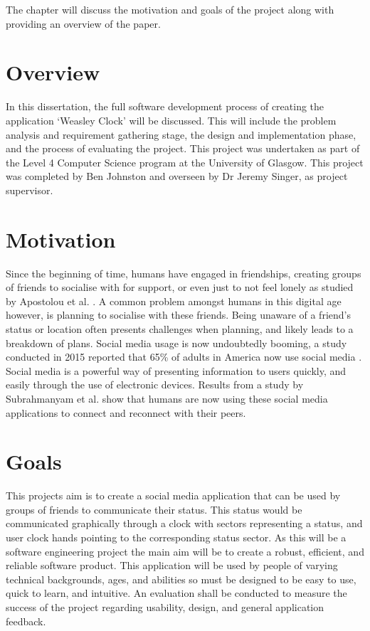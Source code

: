 The chapter will discuss the motivation and goals of the project along with providing an overview of the paper.

\section{Overview}

In this dissertation, the full software development process of creating the application `Weasley Clock' will be discussed. This will include the problem analysis and requirement gathering stage, the design and implementation phase, and the process of evaluating the project. This project was undertaken as part of the Level 4 Computer Science program at the University of Glasgow. This project was completed by Ben Johnston and overseen by Dr Jeremy Singer, as project supervisor.

\section{Motivation}
Since the beginning of time, humans have engaged in friendships, creating groups of friends to socialise with for support, or even just to not feel lonely as studied by Apostolou et al. \cite{whyFriends}. A common problem amongst humans in this digital age however, is planning to socialise with these friends. Being unaware of a friend's status or location often presents challenges when planning, and likely leads to a breakdown of plans.  \newline\newline
Social media usage is now undoubtedly booming, a study conducted in 2015 reported that 65\% of adults in America now use social media \cite{socialMediaUsage}. Social media is a powerful way of presenting information to users quickly, and easily through the use of electronic devices. Results from a study by Subrahmanyam et al. \cite{SUBRAHMANYAM2008420} show that humans are now using these social media applications to connect and reconnect with their peers.


\section{Goals}
This projects aim is to create a social media application that can be used by groups of friends to communicate their status. This status would be communicated graphically through a clock with sectors representing a status, and user clock hands pointing to the corresponding status sector. As this will be a software engineering project the main aim will be to create a robust, efficient, and reliable software product. This application will be used by people of varying technical backgrounds, ages, and abilities so must be designed to be easy to use, quick to learn, and intuitive. An evaluation shall be conducted to measure the success of the project regarding usability, design, and general application feedback.

